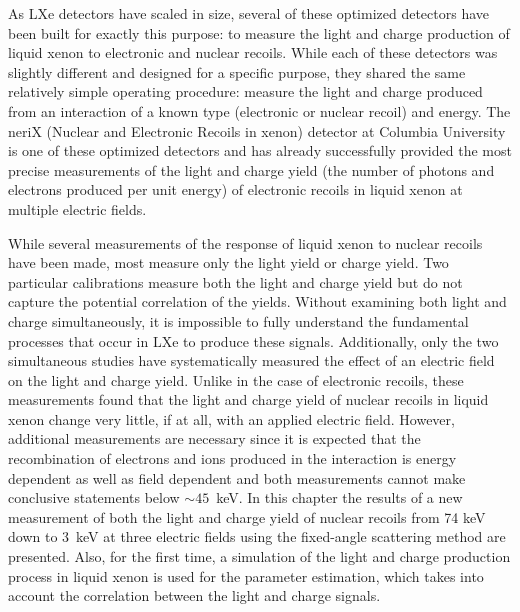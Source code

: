 As LXe detectors have scaled in size, several of these optimized detectors have been built for exactly this purpose: to measure the light and charge production of liquid xenon to electronic and nuclear recoils.  While each of these detectors was slightly different and designed for a specific purpose, they shared the same relatively simple operating procedure: measure the light and charge produced from an interaction of a known type (electronic or nuclear recoil) and energy.  The neriX (Nuclear and Electronic Recoils in xenon) detector at Columbia University is one of these optimized detectors and has already successfully provided the most precise measurements of the light and charge yield (the number of photons and electrons produced per unit energy) of electronic recoils in liquid xenon at multiple electric fields.  

While several measurements of the response of liquid xenon to nuclear recoils have been made, most measure only the light yield or charge yield.  Two particular calibrations \cite{aprile2006simultaneous, manzur2010scintillation} measure both the light and charge yield but do not capture the potential correlation of the yields.  Without examining both light and charge simultaneously, it is impossible to fully understand the fundamental processes that occur in LXe to produce these signals.  Additionally, only the two simultaneous studies \cite{aprile2006simultaneous, manzur2010scintillation} have systematically measured the effect of an electric field on the light and charge yield.  Unlike in the case of electronic recoils, these measurements found that the light and charge yield of nuclear recoils in liquid xenon change very little, if at all, with an applied electric field.  However, additional measurements are necessary since it is expected that the recombination of electrons and ions produced in the interaction is energy dependent as well as field dependent \cite{thomas1987recombination} and both measurements cannot make conclusive statements below $\sim 45$~keV.  In this chapter the results of a new measurement of both the light and charge yield of nuclear recoils from 74 keV down to 3~keV at three electric fields using the fixed-angle scattering method are presented.  Also, for the first time, a simulation of the light and charge production process in liquid xenon is used for the parameter estimation, which takes into account the correlation between the light and charge signals.


